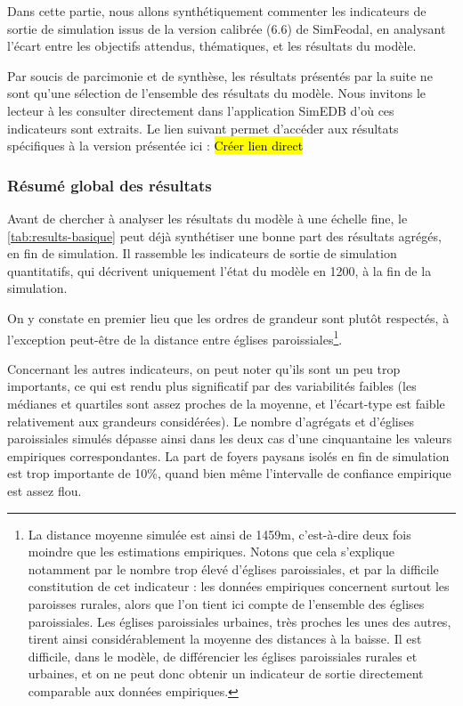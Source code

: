 Dans cette partie, nous allons synthétiquement commenter les indicateurs de sortie de simulation issus de la version calibrée (6.6) de SimFeodal, en analysant l'écart entre les objectifs attendus, thématiques, et les résultats du modèle.

\begin{mdframed}[backgroundcolor=black!5,footnoteinside=false]
Par soucis de parcimonie et de synthèse, les résultats présentés par la suite ne sont qu'une sélection de l'ensemble des résultats du modèle.
Nous invitons le lecteur à les consulter directement dans l'application SimEDB d'où ces indicateurs sont extraits.
Le lien suivant permet d'accéder aux résultats spécifiques à la version présentée ici : \hl{Créer lien direct}
\end{mdframed}

\subsubsection{Résumé global des résultats \label{ssec:results-global}}

Avant de chercher à analyser les résultats du modèle à une échelle fine, le \cref{tab:results-basique} peut déjà synthétiser une bonne part des résultats agrégés, en fin de simulation.
Il rassemble les indicateurs de sortie de simulation quantitatifs, qui décrivent uniquement l'état du modèle en 1200, à la fin de la simulation.




On y constate en premier lieu que les ordres de grandeur sont plutôt respectés, à l'exception peut-être de la distance entre églises paroissiales\footnote{
	La distance moyenne simulée	est ainsi de 1459m, c'est-à-dire deux fois moindre que les estimations empiriques.
	Notons que cela s'explique notamment par le nombre trop élevé d'églises paroissiales, et par la difficile constitution de cet indicateur : les données empiriques concernent surtout les paroisses rurales, alors que l'on tient ici compte de l'ensemble des églises paroissiales.
	Les églises paroissiales urbaines, très proches les unes des autres, tirent ainsi considérablement la moyenne des distances à la baisse.
	Il est difficile, dans le modèle, de différencier les églises paroissiales rurales et urbaines, et on ne peut donc obtenir un indicateur de sortie directement comparable aux données empiriques.
}.

Concernant les autres indicateurs, on peut noter qu'ils sont un peu trop importants, ce qui est rendu plus significatif par des variabilités faibles (les médianes et quartiles sont assez proches de la moyenne, et l'écart-type est faible relativement aux grandeurs considérées).
Le nombre d'agrégats et d'églises paroissiales simulés dépasse ainsi dans les deux cas d'une cinquantaine les valeurs empiriques correspondantes.
La part de foyers paysans isolés en fin de simulation est trop importante de 10\%, quand bien même l'intervalle de confiance empirique est assez flou.

